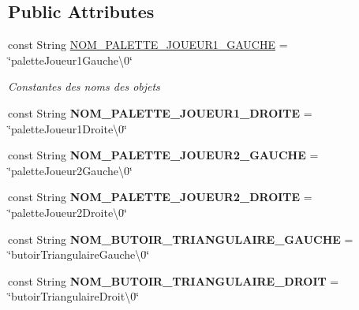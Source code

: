\subsection*{Public Attributes}
\begin{DoxyCompactItemize}
\item 
const String \hyperlink{class_interface_graphique_1_1_mode_editeur_aa0bc708e8e88b3b0ae8ffd6f1c85e8f4}{N\-O\-M\-\_\-\-P\-A\-L\-E\-T\-T\-E\-\_\-\-J\-O\-U\-E\-U\-R1\-\_\-\-G\-A\-U\-C\-H\-E} = \char`\"{}palette\-Joueur1\-Gauche\textbackslash{}0\char`\"{}
\begin{DoxyCompactList}\small\item\em Constantes des noms des objets \end{DoxyCompactList}\item 
\hypertarget{class_interface_graphique_1_1_mode_editeur_aac4523ea42df4e7efac855b908175216}{const String {\bfseries N\-O\-M\-\_\-\-P\-A\-L\-E\-T\-T\-E\-\_\-\-J\-O\-U\-E\-U\-R1\-\_\-\-D\-R\-O\-I\-T\-E} = \char`\"{}palette\-Joueur1\-Droite\textbackslash{}0\char`\"{}}\label{class_interface_graphique_1_1_mode_editeur_aac4523ea42df4e7efac855b908175216}

\item 
\hypertarget{class_interface_graphique_1_1_mode_editeur_aea7106d80768246e236c5fe566152ad8}{const String {\bfseries N\-O\-M\-\_\-\-P\-A\-L\-E\-T\-T\-E\-\_\-\-J\-O\-U\-E\-U\-R2\-\_\-\-G\-A\-U\-C\-H\-E} = \char`\"{}palette\-Joueur2\-Gauche\textbackslash{}0\char`\"{}}\label{class_interface_graphique_1_1_mode_editeur_aea7106d80768246e236c5fe566152ad8}

\item 
\hypertarget{class_interface_graphique_1_1_mode_editeur_a6753a3683e3a39173282013f65e13604}{const String {\bfseries N\-O\-M\-\_\-\-P\-A\-L\-E\-T\-T\-E\-\_\-\-J\-O\-U\-E\-U\-R2\-\_\-\-D\-R\-O\-I\-T\-E} = \char`\"{}palette\-Joueur2\-Droite\textbackslash{}0\char`\"{}}\label{class_interface_graphique_1_1_mode_editeur_a6753a3683e3a39173282013f65e13604}

\item 
\hypertarget{class_interface_graphique_1_1_mode_editeur_a0f11286ee45a344a9b9b1685ca08b515}{const String {\bfseries N\-O\-M\-\_\-\-B\-U\-T\-O\-I\-R\-\_\-\-T\-R\-I\-A\-N\-G\-U\-L\-A\-I\-R\-E\-\_\-\-G\-A\-U\-C\-H\-E} = \char`\"{}butoir\-Triangulaire\-Gauche\textbackslash{}0\char`\"{}}\label{class_interface_graphique_1_1_mode_editeur_a0f11286ee45a344a9b9b1685ca08b515}

\item 
\hypertarget{class_interface_graphique_1_1_mode_editeur_ad2c862e31c9a1be8ce4078c6d8b9a580}{const String {\bfseries N\-O\-M\-\_\-\-B\-U\-T\-O\-I\-R\-\_\-\-T\-R\-I\-A\-N\-G\-U\-L\-A\-I\-R\-E\-\_\-\-D\-R\-O\-I\-T} = \char`\"{}butoir\-Triangulaire\-Droit\textbackslash{}0\char`\"{}}\label{class_interface_graphique_1_1_mode_editeur_ad2c862e31c9a1be8ce4078c6d8b9a580}


\end{DoxyCompactItemize}
